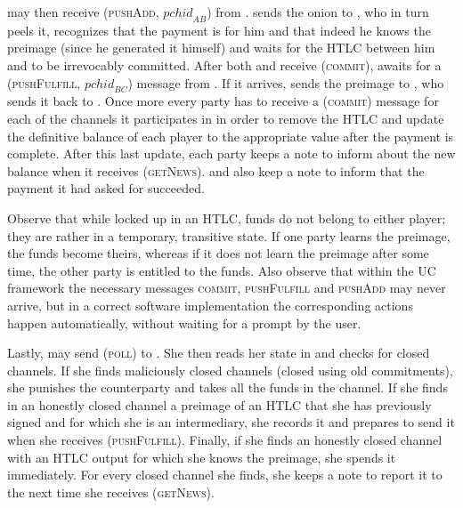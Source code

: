     \bob{} may then receive (\textsc{pushAdd}, $\mathit{pchid}_{AB}$)
    from \environment. \bob{} sends the onion to \charlie, who in turn peels it,
    recognizes that the payment is for him and that indeed he knows the preimage
    (since he generated it himself) and waits for the HTLC between him and
    \bob{} to be irrevocably committed. After both \bob{} and \charlie{} receive
    (\textsc{commit}), \charlie{} awaits for a (\textsc{pushFulfill},
    $\mathit{pchid}_{BC}$) message from \environment. If it arrives,
    \charlie{} sends the preimage to \bob, who sends it back to \alice. Once
    more every party has to receive a (\textsc{commit}) message for each of the
    channels it participates in in order to remove the HTLC and update
    the definitive balance of each player to the appropriate value after the
    payment is complete. After this last update, each party keeps a note to
    inform \environment{} about the new balance when it receives
    (\textsc{getNews}). \alice{} and \charlie{} also keep a note to
    inform \environment{} that the payment it had asked for succeeded.

    Observe that while locked up in an HTLC, funds do not belong to either
    player; they are rather in a temporary, transitive state. If one party
    learns the preimage, the funds become theirs, whereas if it does not learn
    the preimage after some time, the other party is entitled to the funds. Also
    observe that within the UC framework the necessary messages \textsc{commit},
    \textsc{pushFulfill} and \textsc{pushAdd} may never arrive, but in a
    correct software implementation the corresponding actions happen
    automatically, without waiting for a prompt by the user.

    Lastly, \environment{} may send (\textsc{poll}) to \alice. She then reads
    her state in \ledger{} and checks for closed channels. If she finds
    maliciously closed channels (closed using old commitments), she punishes the
    counterparty and takes all the funds in the channel. If she finds in an
    honestly closed channel a preimage of an HTLC that she has previously
    signed and for which she is an intermediary, she records it and prepares to
    send it when she receives (\textsc{pushFulfill}). Finally, if she finds an
    honestly closed channel with an HTLC output for which she knows the
    preimage, she spends it immediately. For every closed channel she finds, she
    keeps a note to report it to \environment{} the next time she receives
    (\textsc{getNews}).

